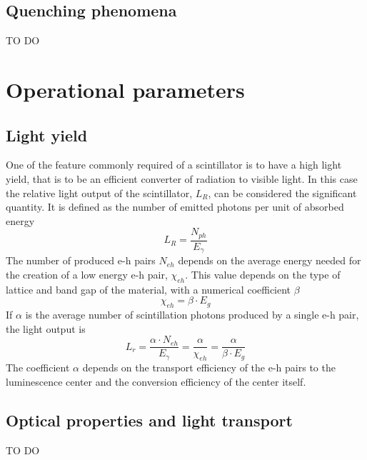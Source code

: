 
\subsection{Quenching phenomena}
TO DO
\section{Operational parameters}
\subsection{Light yield}
One of the feature commonly required of a scintillator is to have a high light yield, that is to be an efficient converter of radiation to visible light.
In this case the relative light output of the scintillator, $L_{R}$, can be considered the significant quantity. It is defined as the number of emitted photons per unit of absorbed energy \cite{Rodnyi1997}
\begin{equation}
L_{R} = \frac{N_{ph}}{E_{\gamma}}
\end{equation}
The number of produced e-h pairs $N_{eh}$ depends on the average energy needed for the creation of a low energy e-h pair, $\chi _{eh}$. This value depends on the type of lattice and band gap of the material, with a numerical coefficient $\beta$
\begin{equation}
\chi _{eh} = \beta \cdot  E_{g}
\end{equation}
If $\alpha$ is the average number of scintillation photons produced by a single e-h pair, the light output is
\begin{equation}
L_{r} = \frac{\alpha \cdot N_{eh}}{E_{\gamma}} = \frac{\alpha}{\chi _{eh}} = \frac{\alpha}{\beta \cdot E_{g}}
\end{equation}
The coefficient $\alpha$ depends on the transport efficiency of the e-h pairs to the luminescence center and the conversion efficiency of the center itself.

\subsection{Optical properties and light transport}
TO DO
